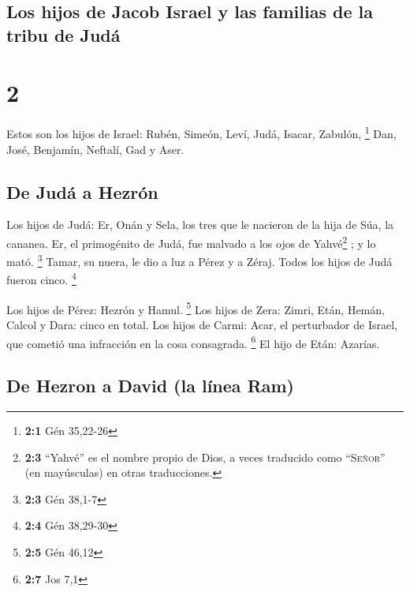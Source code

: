 \begin{paracol}{2}
\hypertarget{los-hijos-de-jacob-israel-y-las-familias-de-la-tribu-de-juduxe1}{%
\subsection{Los hijos de Jacob Israel y las familias de la tribu de
Judá}\label{los-hijos-de-jacob-israel-y-las-familias-de-la-tribu-de-juduxe1}}

\hypertarget{section-2}{%
\section{2}\label{section-2}}

 Estos son los hijos de Israel: Rubén, Simeón, Leví, Judá,
Isacar, Zabulón, \footnote{\textbf{2:1} Gén 35,22-26} 
Dan, José, Benjamín, Neftalí, Gad y Aser.

\hypertarget{de-juduxe1-a-hezruxf3n}{%
\subsection{De Judá a Hezrón}\label{de-juduxe1-a-hezruxf3n}}

 Los hijos de Judá: Er, Onán y Sela, los tres que le
nacieron de la hija de Súa, la cananea. Er, el primogénito de Judá, fue
malvado a los ojos de Yahvé\footnote{\textbf{2:3} ``Yahvé'' es el nombre
  propio de Dios, a veces traducido como ``\textsc{Señor}'' (en
  mayúsculas) en otras traducciones.} ; y lo mató. \footnote{\textbf{2:3}
  Gén 38,1-7}  Tamar, su nuera, le dio a luz a Pérez y a
Zéraj. Todos los hijos de Judá fueron cinco. \footnote{\textbf{2:4} Gén
  38,29-30}

 Los hijos de Pérez: Hezrón y Hamul. \footnote{\textbf{2:5}
  Gén 46,12}  Los hijos de Zera: Zimri, Etán, Hemán,
Calcol y Dara: cinco en total.  Los hijos de Carmi: Acar,
el perturbador de Israel, que cometió una infracción en la cosa
consagrada. \footnote{\textbf{2:7} Jos 7,1}  El hijo de
Etán: Azarías.

\hypertarget{de-hezron-a-david-la-luxednea-ram}{%
\subsection{De Hezron a David (la línea
Ram)}\label{de-hezron-a-david-la-luxednea-ram}}


\end{paracol}

